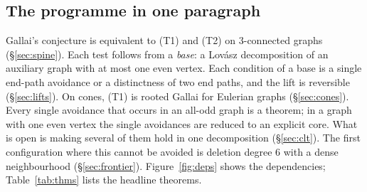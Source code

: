 \documentclass[11pt]{amsart}
\theoremstyle{definition}
\begin{document}
\subsection{The programme in one paragraph}
Gallai's conjecture is equivalent to (T1) and (T2) on $3$-connected graphs
(\S\ref{sec:spine}). Each test follows from a \emph{base}: a Lov\'asz decomposition of an auxiliary
graph with at most one even vertex. Each condition of a base is a single end-path avoidance or a
distinctness of two end paths, and the lift is reversible (\S\ref{sec:lifts}). On cones, (T1) is
rooted Gallai for Eulerian graphs (\S\ref{sec:cones}). Every single avoidance that occurs in an
all-odd graph is a theorem; in a graph with one even vertex the single avoidances are reduced to an
explicit core. What is open is making several of them hold in one decomposition (\S\ref{sec:clt}). The first configuration where this cannot be avoided is deletion
degree $6$ with a dense neighbourhood (\S\ref{sec:frontier}). Figure~\ref{fig:deps} shows the
dependencies; Table~\ref{tab:thms} lists the headline theorems.
\end{document}
